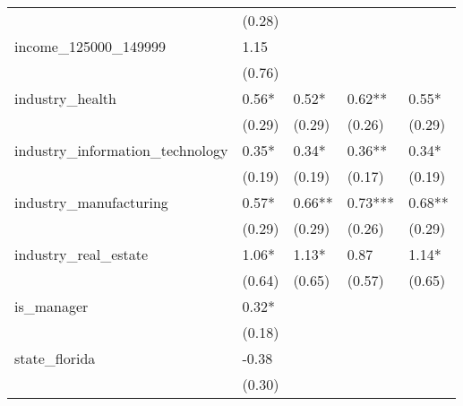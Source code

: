 {\begin{table}
\begin{center}
\begin{tabular}{lllll}
                                              & (0.28)              &                      &                       &                         \\
    income\_125000\_149999                    & 1.15                &                      &                       &                         \\
                                              & (0.76)              &                      &                       &                         \\
    industry\_health                          & 0.56*               & 0.52*                & 0.62**                & 0.55*                   \\
                                              & (0.29)              & (0.29)               & (0.26)                & (0.29)                  \\
    industry\_information\_technology         & 0.35*               & 0.34*                & 0.36**                & 0.34*                   \\
                                              & (0.19)              & (0.19)               & (0.17)                & (0.19)                  \\
    industry\_manufacturing                   & 0.57*               & 0.66**               & 0.73***               & 0.68**                  \\
                                              & (0.29)              & (0.29)               & (0.26)                & (0.29)                  \\
    industry\_real\_estate                    & 1.06*               & 1.13*                & 0.87                  & 1.14*                   \\
                                              & (0.64)              & (0.65)               & (0.57)                & (0.65)                  \\
    is\_manager                               & 0.32*               &                      &                       &                         \\
                                              & (0.18)              &                      &                       &                         \\
    state\_florida                            & -0.38               &                      &                       &                         \\
                                              & (0.30)              &                      &                       &                         \\

\end{tabular}
\end{center}
\end{table}}
